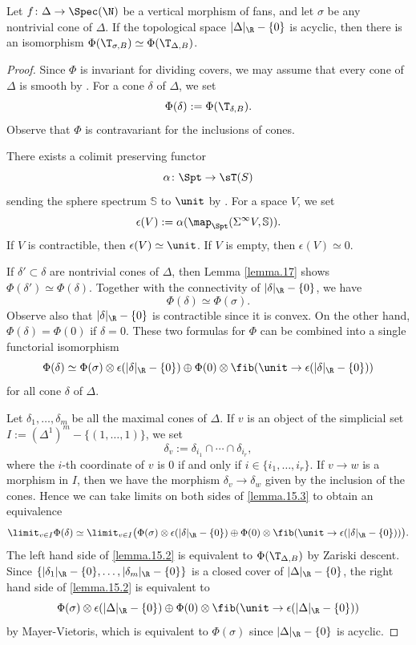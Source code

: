 \documentclass[10pt]{amsart}
\begin{document}
\begin{lem}
\label{lemma.15}
Let $f\colon \Delta\to \Spec(\N)$ be a vertical morphism of fans, and let $\sigma$ be any nontrivial cone of $\Delta$.
If the topological space $|\Delta|_{\R}-\{0\}$ is acyclic, then there is an isomorphism $\Phi(\T_{\sigma,B})\simeq \Phi(\T_{\Delta,B})$.
\end{lem}
\begin{proof}
Since $\Phi$ is invariant for dividing covers, we may assume that every cone of $\Delta$ is smooth by \cite[Theorem 11.1.9]{CLStoric}.
For a cone $\delta$ of $\Delta$, we set
\[
\Phi(\delta)
:=
\Phi(\T_{\delta,B}).
\]
Observe that $\Phi$ is contravariant for the inclusions of cones.

There exists a colimit preserving functor
\[
\alpha\colon \Spt \to \sT(S)
\]
sending the sphere spectrum $\mathbb{S}$ to $\unit$ by \cite[Corollary 1.4.4.6]{HA}.
For a space $V$, we set
\[
\epsilon(V)
:=
\alpha(\map_{\Spt}(\Sigma^\infty V,\mathbb{S})).
\]
If $V$ is contractible, then $\epsilon(V)\simeq \unit$.
If $V$ is empty, then $\epsilon(V)\simeq 0$.

If $\delta'\subset \delta$ are nontrivial cones of $\Delta$, then Lemma \ref{lemma.17} shows $\Phi(\delta')\simeq \Phi(\delta)$.
Together with the connectivity of $|\delta|_{\R}-\{0\}$, we have
\[
\Phi(\delta)\simeq \Phi(\sigma).
\]
Observe also that $|\delta|_{\R}-\{0\}$ is contractible since it is convex.
On the other hand, $\Phi(\delta)=\Phi(0)$ if $\delta=0$.
These two formulas for $\Phi$ can be combined into a single functorial isomorphism
\begin{equation}
\label{lemma.15.3}
\Phi(\delta)
\simeq
\Phi(\sigma)\otimes \epsilon(|\delta|_{\R}-\{0\})
\oplus
\Phi(0)\otimes \fib(\unit \to \epsilon(|\delta|_{\R}-\{0\}))
\end{equation}
for all cone $\delta$ of $\Delta$.

Let $\delta_1,\ldots,\delta_m$ be all the maximal cones of $\Delta$.
If $v$ is an object of the simplicial set $I:=(\Delta^1)^m-\{(1,\ldots,1)\}$, we set
\[
\delta_v:=\delta_{i_1}\cap \cdots \cap \delta_{i_r},
\]
where the $i$-th coordinate of $v$ is $0$ if and only if $i\in \{i_1,\ldots,i_r\}$.
If $v\to w$ is a morphism in $I$, then we have the morphism $\delta_v\to \delta_w$ given by the inclusion of the cones.
Hence we can take limits on both sides of \eqref{lemma.15.3} to obtain an equivalence
\begin{equation}
\label{lemma.15.2}
\limit_{v\in I} \Phi(\delta)
\simeq
\limit_{v\in I}
\big(
\Phi(\sigma)\otimes \epsilon(|\delta|_{\R}-\{0\})
\oplus
\Phi(0)\otimes \fib(\unit \to \epsilon(|\delta|_{\R}-\{0\}))
\big).
\end{equation}
The left hand side of \eqref{lemma.15.2} is equivalent to $\Phi(\T_{\Delta,B})$ by Zariski descent.
Since $\{|\delta_1|_{\R}-\{0\},\ldots,|\delta_m|_{\R}-\{0\}\}$ is a closed cover of $|\Delta|_{\R}-\{0\}$, the right hand side of \eqref{lemma.15.2} is equivalent to
\[
\Phi(\sigma)\otimes \epsilon(|\Delta|_{\R}-\{0\})
\oplus
\Phi(0)\otimes \fib(\unit \to \epsilon(|\Delta|_{\R}-\{0\}))
\]
by Mayer-Vietoris, which is equivalent to $\Phi(\sigma)$ since $|\Delta|_{\R}-\{0\}$ is acyclic.
\end{proof}
\end{document}
